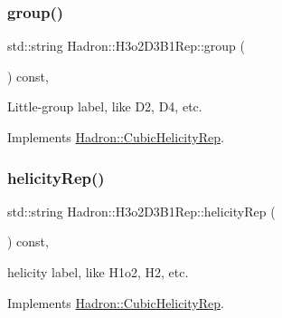 \mbox{\label{structHadron_1_1H3o2D3B1Rep_a0839d8685752d851d9175eb3cfb568d7}} 
\subsubsection{\texorpdfstring{group()}{group()}\hspace{0.1cm}{\footnotesize\ttfamily [5/5]}}
{\footnotesize\ttfamily std\+::string Hadron\+::\+H3o2\+D3\+B1\+Rep\+::group (\begin{DoxyParamCaption}{ }\end{DoxyParamCaption}) const\hspace{0.3cm}{\ttfamily [inline]}, {\ttfamily [virtual]}}

Little-\/group label, like D2, D4, etc. 

Implements \mbox{\hyperlink{structHadron_1_1CubicHelicityRep_a101a7d76cd8ccdad0f272db44b766113}{Hadron\+::\+Cubic\+Helicity\+Rep}}.

\mbox{\label{structHadron_1_1H3o2D3B1Rep_a7d01a3bd011469f3f901f6bbaeaa0394}} 
\subsubsection{\texorpdfstring{helicityRep()}{helicityRep()}\hspace{0.1cm}{\footnotesize\ttfamily [1/3]}}
{\footnotesize\ttfamily std\+::string Hadron\+::\+H3o2\+D3\+B1\+Rep\+::helicity\+Rep (\begin{DoxyParamCaption}{ }\end{DoxyParamCaption}) const\hspace{0.3cm}{\ttfamily [inline]}, {\ttfamily [virtual]}}

helicity label, like H1o2, H2, etc. 

Implements \mbox{\hyperlink{structHadron_1_1CubicHelicityRep_af1096946b7470edf0a55451cc662f231}{Hadron\+::\+Cubic\+Helicity\+Rep}}.

\mbox{\label{structHadron_1_1H3o2D3B1Rep_a7d01a3bd011469f3f901f6bbaeaa0394}} 
